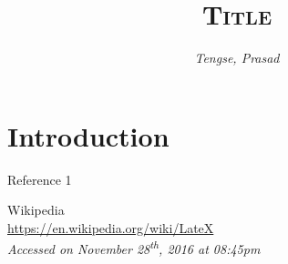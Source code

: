 \documentclass[11pt]{article}
\title{\vspace{-7ex}\textsc{Title}\vspace{-2ex}}
\author{\emph{Tengse, Prasad}\\}
\date{}
\begin{document}
		\tableofcontents
		\listoffigures
		\pagebreak


\section{Introduction}
\hspace{1.5ex}
\begin{thebibliography}{10}
	Reference 1

	Wikipedia \\
	\url{https://en.wikipedia.org/wiki/LateX}\\
	\textit{Accessed on November 28\textsuperscript{th}, 2016 at 08:45pm}



\end{thebibliography}
\pagebreak

\end{document}
